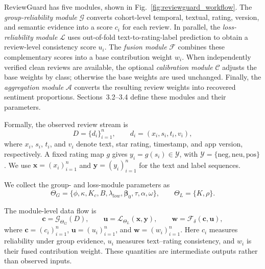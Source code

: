 \documentclass[runningheads]{llncs}
\begin{document}
ReviewGuard has five modules, shown in Fig.~\ref{fig:reviewguard_workflow}. The \emph{group-reliability module} \(\mathcal{G}\) converts cohort-level temporal, textual, rating, version, and semantic evidence into a score \(c_i\) for each review. In parallel, the \emph{loss-reliability module} \(\mathcal{L}\) uses out-of-fold text-to-rating-label prediction to obtain a review-level consistency score \(u_i\). The \emph{fusion module} \(\mathcal{F}\) combines these complementary scores into a base contribution weight \(w_i\). When independently verified clean reviews are available, the optional \emph{calibration module} \(\mathcal{C}\) adjusts the base weights by class; otherwise the base weights are used unchanged. Finally, the \emph{aggregation module} \(\mathcal{A}\) converts the resulting review weights into recovered sentiment proportions. Sections~3.2--3.4 define these modules and their parameters.

Formally, the observed review stream is
\[
D=\{d_i\}_{i=1}^{n}, \qquad d_i=(x_i,s_i,t_i,v_i),
\]
where \(x_i\), \(s_i\), \(t_i\), and \(v_i\) denote text, star rating, timestamp, and app version, respectively. A fixed rating map \(g\) gives \(y_i=g(s_i)\in\mathcal{Y}\), with \(\mathcal{Y}=\{\mathrm{neg},\mathrm{neu},\mathrm{pos}\}\). We use \(\mathbf{x}=(x_i)_{i=1}^{n}\) and \(\mathbf{y}=(y_i)_{i=1}^{n}\) for the text and label sequences.

We collect the group- and loss-module parameters as
\[
\Theta_G=\{\phi,\kappa,K_c,B,\lambda_{low},\boldsymbol{\beta}_0,
\tau,\alpha,\omega\},
\qquad
\Theta_L=\{K,\rho\}.
\]

The module-level data flow is
\begin{equation}
\mathbf{c}=\mathcal{G}_{\Theta_G}(D), \qquad
\mathbf{u}=\mathcal{L}_{\Theta_L}(\mathbf{x},\mathbf{y}), \qquad
\mathbf{w}=\mathcal{F}_{\delta}(\mathbf{c},\mathbf{u}),
\label{eq:reviewguard_base_flow}
\end{equation}
where \(\mathbf{c}=(c_i)_{i=1}^{n}\), \(\mathbf{u}=(u_i)_{i=1}^{n}\), and \(\mathbf{w}=(w_i)_{i=1}^{n}\). Here \(c_i\) measures reliability under group evidence, \(u_i\) measures text--rating consistency, and \(w_i\) is their fused contribution weight. These quantities are intermediate outputs rather than observed inputs.
\end{document}
